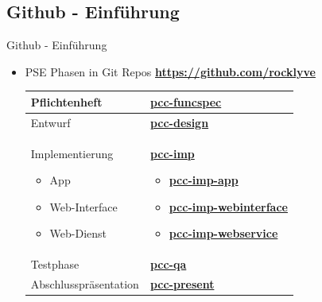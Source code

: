 \documentclass[19pt]{beamer}
\begin{document}
\subsection{Github - Einf\"{u}hrung}
\begin{frame}{Github - Einf\"{u}hrung}
\begin{itemize}
\item PSE Phasen in Git Repos \textbf{\href{https://github.com/rocklyve}{https://github.com/rocklyve}} \\

    	\begin{tabular}{| p{} | p{} |}
  			\hline			
  			Pflichtenheft & \textbf{\href{https://github.com/rocklyve/pcc-funcspec}{pcc-funcspec}}\\
  			\hline			
  			Entwurf & \textbf{\href{https://github.com/rocklyve/pcc-design}{pcc-design}}\\
  			\hline			
  			Implementierung 
  			\begin{itemize}
				\item App
				\item Web-Interface
				\item Web-Dienst
			\end{itemize} & \textbf{\href{https://github.com/rocklyve/pcc-imp}{pcc-imp}} \begin{itemize}
				\item \textbf{\href{https://github.com/rocklyve/pcc-imp-app}{pcc-imp-app}}
				\item \textbf{\href{https://github.com/rocklyve/pcc-imp-webinterface}{pcc-imp-webinterface}}
				\item \textbf{\href{https://github.com/rocklyve/pcc-imp-webservice}{pcc-imp-webservice}}
			\end{itemize}\\
  			\hline
  			Testphase & \textbf{\href{https://github.com/rocklyve/pcc-qa}{pcc-qa}}\\
  			\hline
  			Abschlusspr\"{a}sentation & \textbf{\href{https://github.com/rocklyve/pcc-present}{pcc-present}}\\
		  	\hline  
		\end{tabular}
	\end{itemize}
\end{frame}
\end{document}
